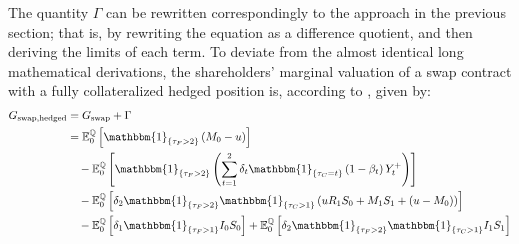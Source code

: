 \documentclass[main.tex]{subfiles}
\begin{document}
        The quantity $\Gamma$ can be rewritten correspondingly to the approach in the previous section;
        that is, by rewriting the equation as a difference quotient, and then deriving the limits of each term.
        To deviate from the almost identical long mathematical derivations,
        the shareholders' marginal valuation of a swap contract with a fully collateralized hedged position is, according to \textcite{ADS2018}, given by:
        \begin{align}
            G_{\text{swap,hedged}} &= G_{\text{swap}} + \Gamma
            \\
            &=
            \mathbb{E}_{0}^{\rnmeasure}\left[
                \mathbbm{1}_{\{\tau_{F}>2\}}
                \left(
                    M_0 - u
                \right)
            \right]
            \nonumber
            \\
            &\quad-
            \mathbb{E}_{0}^{\rnmeasure}\left[
                \mathbbm{1}_{\{\tau_{F}>2\}}
                \left(
                    \sum_{t=1}^{2} \delta_{t} \mathbbm{1}_{\{\tau_{C}=t\}}\left(1-\beta_t\right)Y_{t}^{+}
                \right)
            \right]
            \nonumber
            \\
            &\quad-
            \mathbb{E}_{0}^{\rnmeasure}\left[
                \delta_2 \mathbbm{1}_{\{\tau_{F}>2\}} \mathbbm{1}_{\{\tau_{C}>1\}}
                \left(
                    u R_{1} S_{0} + M_{1} S_{1} + (u - M_0)
                \right)
            \right]
            \nonumber
            \\
            &\quad-
            \mathbb{E}_{0}^{\rnmeasure}\left[
                \delta_1 \mathbbm{1}_{\{\tau_{F}>1\}}
                I_0 S_0 
            \right] 
            +
            \mathbb{E}_{0}^{\rnmeasure}\left[
                \delta_2 \mathbbm{1}_{\{\tau_{F}>2\}} \mathbbm{1}_{\{\tau_{C}>1\}}
                I_1 S_1 
            \right] 
        \end{align}
\end{document}
